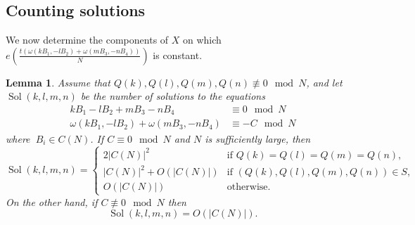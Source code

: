 \documentclass[12pt]{amsart}
\newtheorem{lem}[thm]{Lemma}%
\theoremstyle{plain}
\newcommand{\sol}{\operatorname{Sol}}
\newcommand{\torus}{C(N)} %
\renewcommand{\^}{\widehat}
\begin{document}
\subsection{Counting solutions}
\label{sec:counting-solutions}
We now determine the components of $X$ on which
$e \left( \frac{t(\omega(kB_1,-l B_2)+\omega(mB_3,-n B_4))  }{N}
\right)$ is constant.
\begin{lem}
\label{lem:number-of-diagonal-solutions}
Assume that $Q(k), Q(l),Q(m), Q(n) \not \equiv 0 \mod N$, and let
$\sol(k,l,m,n)$ be the number of solutions to the equations  
\begin{align}
\label{eq:5}
k B_1 - l B_2 + m B_3 -  n B_4  &\equiv 0 \mod N
\\
\label{eq:6}
\omega(kB_1,-l B_2)+\omega(mB_3,-n B_4) &\equiv -C \mod N
\end{align}
where $\ B_i \in \torus$.
%
%
If $C  \equiv 0 \mod N$ and %
$N$ is sufficiently large, then
\begin{equation}
  \label{eq:9}
\sol(k,l,m,n) =
\begin{cases}
2 |\torus|^2 & 
\text{if $Q(k) = Q(l) =Q(m) =  Q(n)$,} \\
|\torus|^2 + O(|\torus|) & 
\text{if $(Q(k),Q(l),Q(m),Q(n))  \in S$,}\\
O(|\torus|) &
\text{otherwise.}
\end{cases}
\end{equation}
On the other hand, if $C \not \equiv 0 \mod N$ then 
$$
\sol(k,l,m,n) = 
O(|\torus|).
$$
%
\end{lem}
\end{document}
